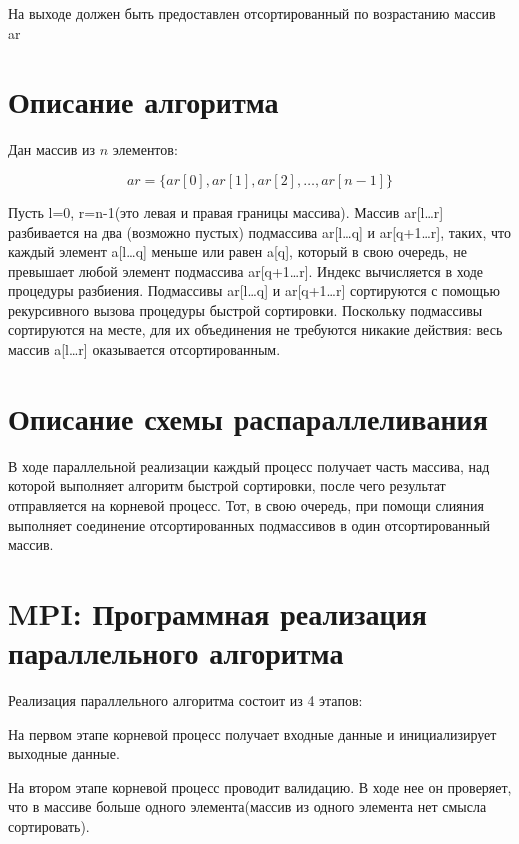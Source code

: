 \documentclass{report}
\begin{document}
На выходе должен быть предоставлен отсортированный по возрастанию массив ar

\newpage

\section*{Описание алгоритма}  

Дан массив из $n$ элементов:

\[
ar = \{ ar[0], ar[1], ar[2], \dots, ar[n-1] \}
\]

Пусть l=0, r=n-1(это левая и правая границы массива). Массив ar[l…r] разбивается на два (возможно пустых) подмассива ar[l…q] и ar[q+1…r], таких, что каждый элемент a[l…q] меньше или равен a[q], который в свою очередь, не превышает любой элемент подмассива ar[q+1…r]. Индекс вычисляется в ходе процедуры разбиения. Подмассивы ar[l…q] и ar[q+1…r] сортируются с помощью рекурсивного вызова процедуры быстрой сортировки. Поскольку подмассивы сортируются на месте, для их объединения не требуются никакие действия: весь массив a[l…r] оказывается отсортированным.

\section*{Описание схемы распараллеливания}  

В ходе параллельной реализации каждый процесс получает часть массива, над которой выполняет алгоритм быстрой сортировки, после чего результат отправляется на корневой процесс. Тот, в свою очередь, при помощи слияния выполняет соединение отсортированных подмассивов в один отсортированный массив.

\section*{MPI: Программная реализация параллельного алгоритма}  

Реализация параллельного алгоритма состоит из 4 этапов:

На первом этапе корневой процесс получает входные данные и инициализирует выходные данные.

На втором этапе корневой процесс проводит валидацию. В ходе нее он проверяет, что в массиве больше одного элемента(массив из одного элемента нет смысла сортировать).
\end{document}
